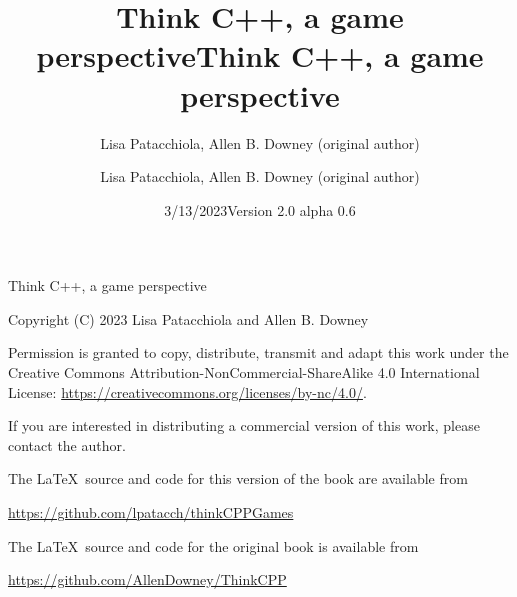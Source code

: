 \documentclass{book}
\title{Think C++, a game perspective}
\author{Lisa Patacchiola, Allen B. Downey (original author)}
\date{3/13/2023}
\begin{document}
\title {Think C++, a game perspective}
\author {Lisa Patacchiola, Allen B. Downey (original author)}
\date {Version 2.0 alpha 0.6}
\maketitle

\vspace{2in}
\begin{center}
{\Large Think C++, a game perspective}

\vspace{0.25in}

Copyright (C) 2023 Lisa Patacchiola and Allen B. Downey
\end{center}
\vspace{0.25in}

Permission is granted to copy, distribute, transmit and adapt this
work under the Creative Commons Attribution-NonCommercial-ShareAlike 4.0
International License: \url{https://creativecommons.org/licenses/by-nc/4.0/}.

If you are interested in distributing a commercial version of this
work, please contact the author.

\bigskip
The \LaTeX\ source and code for this version of the book are available from

\bigskip
\url{https://github.com/lpatacch/thinkCPPGames}

\bigskip
The \LaTeX\ source and code for the original book is available from

\bigskip
\url{https://github.com/AllenDowney/ThinkCPP}



\frontmatter

\tableofcontents

\mainmatter



















\appendix


\printindex
\end{document}

